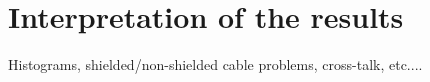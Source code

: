 \section{Interpretation of the results}
\label{sec:Results}

Histograms, shielded/non-shielded cable problems, cross-talk, etc....

